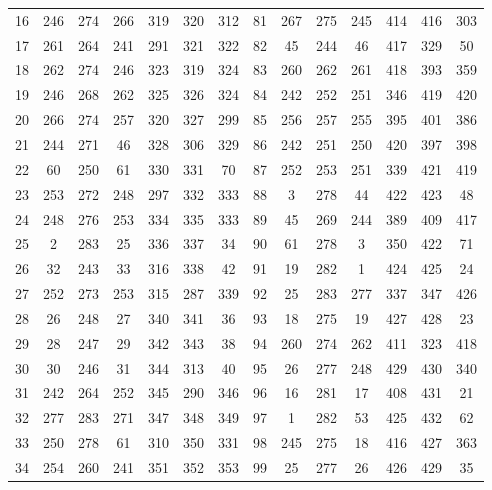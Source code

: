 \begin{apendicesenv}
\begin{table}[H]
\begin{tabular}{@{}ccccccc@{\hspace{1.0cm}}ccccccc@{}}
		16 &  246 &  274 &  266 &  319 &  320 &  312 &  81 &  267 &  275 &  245 &  414 &  416 &  303 \\
		17 &  261 &  264 &  241 &  291 &  321 &  322 &  82 &   45 &  244 &   46 &  417 &  329 &   50 \\
		18 &  262 &  274 &  246 &  323 &  319 &  324 &  83 &  260 &  262 &  261 &  418 &  393 &  359 \\
		19 &  246 &  268 &  262 &  325 &  326 &  324 &  84 &  242 &  252 &  251 &  346 &  419 &  420 \\
		20 &  266 &  274 &  257 &  320 &  327 &  299 &  85 &  256 &  257 &  255 &  395 &  401 &  386 \\
		21 &  244 &  271 &   46 &  328 &  306 &  329 &  86 &  242 &  251 &  250 &  420 &  397 &  398 \\
		22 &   60 &  250 &   61 &  330 &  331 &   70 &  87 &  252 &  253 &  251 &  339 &  421 &  419 \\
		23 &  253 &  272 &  248 &  297 &  332 &  333 &  88 &    3 &  278 &   44 &  422 &  423 &   48 \\
		24 &  248 &  276 &  253 &  334 &  335 &  333 &  89 &   45 &  269 &  244 &  389 &  409 &  417 \\
		25 &    2 &  283 &   25 &  336 &  337 &   34 &  90 &   61 &  278 &    3 &  350 &  422 &   71 \\
		26 &   32 &  243 &   33 &  316 &  338 &   42 &  91 &   19 &  282 &    1 &  424 &  425 &   24 \\
		27 &  252 &  273 &  253 &  315 &  287 &  339 &  92 &   25 &  283 &  277 &  337 &  347 &  426 \\
		28 &   26 &  248 &   27 &  340 &  341 &   36 &  93 &   18 &  275 &   19 &  427 &  428 &   23 \\
		29 &   28 &  247 &   29 &  342 &  343 &   38 &  94 &  260 &  274 &  262 &  411 &  323 &  418 \\
		30 &   30 &  246 &   31 &  344 &  313 &   40 &  95 &   26 &  277 &  248 &  429 &  430 &  340 \\
		31 &  242 &  264 &  252 &  345 &  290 &  346 &  96 &   16 &  281 &   17 &  408 &  431 &   21 \\
		32 &  277 &  283 &  271 &  347 &  348 &  349 &  97 &    1 &  282 &   53 &  425 &  432 &   62 \\
		33 &  250 &  278 &   61 &  310 &  350 &  331 &  98 &  245 &  275 &   18 &  416 &  427 &  363 \\
		34 &  254 &  260 &  241 &  351 &  352 &  353 &  99 &   25 &  277 &   26 &  426 &  429 &   35 \\

\end{tabular}
\end{table}
\end{apendicesenv}
